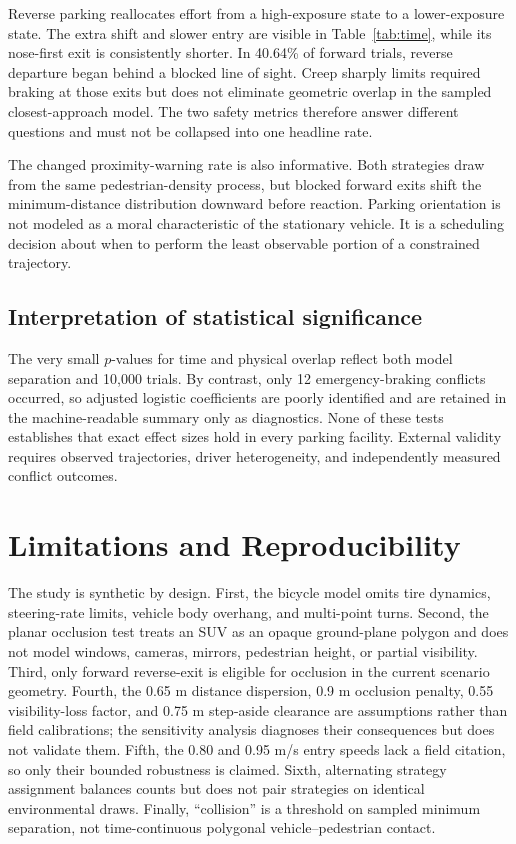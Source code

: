\documentclass[11pt]{article}
\begin{document}
Reverse parking reallocates effort from a high-exposure state to a lower-exposure state. The extra shift and slower entry are visible in Table~\ref{tab:time}, while its nose-first exit is consistently shorter. In 40.64\% of forward trials, reverse departure began behind a blocked line of sight. Creep sharply limits required braking at those exits but does not eliminate geometric overlap in the sampled closest-approach model. The two safety metrics therefore answer different questions and must not be collapsed into one headline rate.

The changed proximity-warning rate is also informative. Both strategies draw from the same pedestrian-density process, but blocked forward exits shift the minimum-distance distribution downward before reaction. Parking orientation is not modeled as a moral characteristic of the stationary vehicle. It is a scheduling decision about when to perform the least observable portion of a constrained trajectory.

\subsection{Interpretation of statistical significance}

The very small $p$-values for time and physical overlap reflect both model separation and 10,000 trials. By contrast, only 12 emergency-braking conflicts occurred, so adjusted logistic coefficients are poorly identified and are retained in the machine-readable summary only as diagnostics. None of these tests establishes that exact effect sizes hold in every parking facility. External validity requires observed trajectories, driver heterogeneity, and independently measured conflict outcomes.

\section{Limitations and Reproducibility}

The study is synthetic by design. First, the bicycle model omits tire dynamics, steering-rate limits, vehicle body overhang, and multi-point turns. Second, the planar occlusion test treats an SUV as an opaque ground-plane polygon and does not model windows, cameras, mirrors, pedestrian height, or partial visibility. Third, only forward reverse-exit is eligible for occlusion in the current scenario geometry. Fourth, the 0.65 m distance dispersion, 0.9 m occlusion penalty, 0.55 visibility-loss factor, and 0.75 m step-aside clearance are assumptions rather than field calibrations; the sensitivity analysis diagnoses their consequences but does not validate them. Fifth, the 0.80 and 0.95 m/s entry speeds lack a field citation, so only their bounded robustness is claimed. Sixth, alternating strategy assignment balances counts but does not pair strategies on identical environmental draws. Finally, ``collision'' is a threshold on sampled minimum separation, not time-continuous polygonal vehicle--pedestrian contact.
\end{document}
